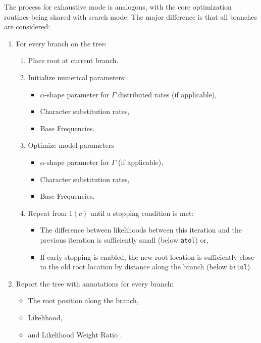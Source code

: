 \documentclass{article}
\begin{document}
The process for exhaustive mode is analogous, with the core optimization routines
being shared with search mode. The major difference is that all branches are
considered:

\begin{enumerate}
    \item For every branch on the tree:
    \begin{enumerate}
      \item Place root at current branch.
      \item Initialize numerical parameters:
                \begin{itemize}
                  \item $\alpha$-shape parameter for $\Gamma$ distributed rates
                    (if applicable),
                  \item Character substitution rates,
                  \item Base Frequencies.
                \end{itemize}
          \item Optimize model parameters
                \begin{itemize}
                  \item $\alpha$-shape parameter for $\Gamma$ (if applicable),
                  \item Character substitution rates,
                  \item Base Frequencies.
                \end{itemize}
          \item Repeat from $1(c)$ until a stopping condition is met:
                \begin{itemize}
                  \item The difference between likelihoods between this
                        iteration and the previous iteration is sufficiently
                        small (below \texttt{atol}) or,
                  \item If early stopping is enabled, the new root location is
                        sufficiently close to the old root location by distance
                        along the branch (below \texttt{brtol}).
                \end{itemize}
    \end{enumerate}
  \item Report the tree with annotations for every branch:
    \begin{itemize}
      \item The root position along the branch,
      \item Likelihood,
      \item and Likelihood Weight Ratio \cite{strimmer_inferring_2002}.
    \end{itemize}
\end{enumerate}
\end{document}
